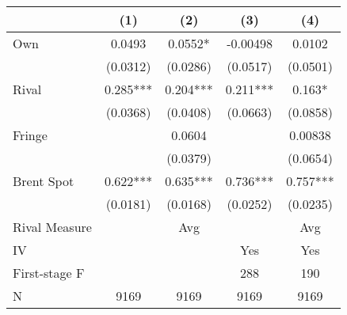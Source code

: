 {
\def\sym#1{\ifmmode^{#1}\else\(^{#1}\)\fi}
\begin{tabular}{l*{4}{c}}
\toprule
                &\multicolumn{1}{c}{(1)}   &\multicolumn{1}{c}{(2)}   &\multicolumn{1}{c}{(3)}   &\multicolumn{1}{c}{(4)}   \\
\midrule
Own             &   0.0493   &   0.0552*  & -0.00498   &   0.0102   \\
                & (0.0312)   & (0.0286)   & (0.0517)   & (0.0501)   \\
\addlinespace
Rival           &    0.285***&    0.204***&    0.211***&    0.163*  \\
                & (0.0368)   & (0.0408)   & (0.0663)   & (0.0858)   \\
\addlinespace
Fringe          &            &   0.0604   &            &  0.00838   \\
                &            & (0.0379)   &            & (0.0654)   \\
\addlinespace
Brent Spot      &    0.622***&    0.635***&    0.736***&    0.757***\\
                & (0.0181)   & (0.0168)   & (0.0252)   & (0.0235)   \\
\midrule
Rival Measure   &            &      Avg   &            &      Avg   \\
IV              &            &            &      Yes   &      Yes   \\
First-stage F   &            &            &      288   &      190   \\
N               &     9169   &     9169   &     9169   &     9169   \\
\bottomrule
\end{tabular}
}
